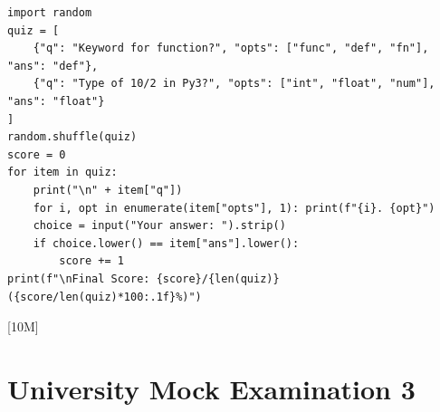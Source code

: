 \begin{solutionbox}
\begin{enumerate}[start=17]
    \begin{lstlisting}[language=Python3]
import random
quiz = [
    {"q": "Keyword for function?", "opts": ["func", "def", "fn"], "ans": "def"},
    {"q": "Type of 10/2 in Py3?", "opts": ["int", "float", "num"], "ans": "float"}
]
random.shuffle(quiz)
score = 0
for item in quiz:
    print("\n" + item["q"])
    for i, opt in enumerate(item["opts"], 1): print(f"{i}. {opt}")
    choice = input("Your answer: ").strip()
    if choice.lower() == item["ans"].lower():
        score += 1
print(f"\nFinal Score: {score}/{len(quiz)} ({score/len(quiz)*100:.1f}%)")
    \end{lstlisting} [10M]
\end{enumerate}
\end{solutionbox}

\section{University Mock Examination 3}

